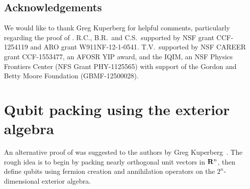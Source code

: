 \documentclass[preprintnumbers,11pt,onecolumn]{article}
\begin{document}



\subsection*{Acknowledgements}

We would like to thank Greg Kuperberg for helpful comments, particularly regarding the proof of .  
R.C., B.R.~and C.S.~supported by NSF grant CCF-1254119 and ARO grant W911NF-12-1-0541.  T.V.~supported by NSF CAREER grant CCF-1553477, an AFOSR YIP award, and the IQIM, an NSF Physics Frontiers Center (NFS Grant PHY-1125565) with support of the Gordon and Betty Moore Foundation (GBMF-12500028).  






\appendix


\section{Qubit packing using the exterior algebra} \label{s:qubitpackingprooftwo}

An alternative proof of  was suggested to the authors by Greg Kuperberg~\cite{kuperberg14personal}.  The rough idea is to begin by packing nearly orthogonal unit vectors in ${\bf R}^n$, then define qubits using fermion creation and annihilation operators on the $2^n$-dimensional exterior algebra.   
\end{document}
